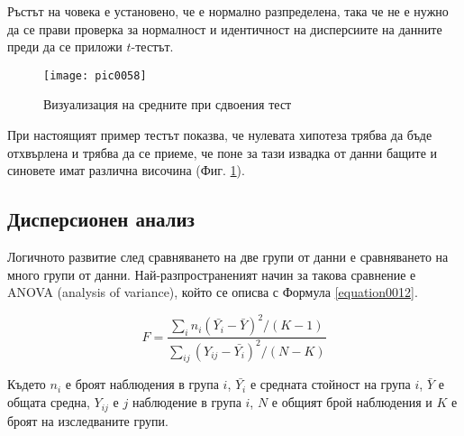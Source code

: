 Ръстът на човека е установено, че е нормално разпределена, така че не е нужно да се прави проверка за нормалност и идентичност на дисперсиите на данните преди да се приложи $t$-тестът. 

\begin{figure}[h!]
  \centering
  \texttt{[image: pic0058]}
  \caption{Визуализация на средните при сдвоения тест}
\label{figure0058}
\end{figure}
\FloatBarrier

При настоящият пример тестът показва, че нулевата хипотеза трябва да бъде отхвърлена и трябва да се приеме, че поне за тази извадка от данни бащите и синовете имат различна височина (Фиг. \ref{figure0058}). 

\subsection{Дисперсионен анализ}

Логичното развитие след сравняването на две групи от данни е сравняването на много групи от данни. Най-разпространеният начин за такова сравнение е ANOVA (analysis of variance), който се описва с Формула \ref{equation0012}.

\begin{equation}
F = \frac{ \sum_{i}^{}n_i(\bar{Y_i}-\bar{Y})^2 / (K-1) }{ \sum_{ij}^{}(Y_{ij}-\bar{Y_i})^2 / (N-K) }
\label{equation0012}
\end{equation}

Където $n_i$ е броят наблюдения в група $i$, $\bar{Y_i}$ е средната стойност на група $i$, $\bar{Y}$ е общата средна, $Y_{ij}$ е $j$ наблюдение в група $i$, $N$ е общият брой наблюдения и $K$ е броят на изследваните групи. 


